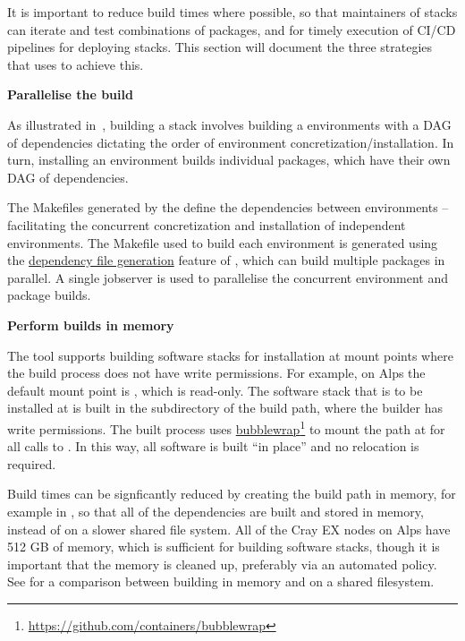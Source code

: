 It is important to reduce build times where possible, so that maintainers of stacks can iterate and test combinations of packages, and for timely execution of CI/CD pipelines for deploying stacks.
This section will document the three strategies that \stackinator uses to achieve this.

\noindent\textbf{Parallelise the build}

As illustrated in~, building a \spack stack involves building a \spack environments with a DAG of dependencies dictating the order of environment concretization/installation.
In turn, installing an environment builds individual packages, which have their own DAG of dependencies.

The Makefiles generated by the \stackinator define the dependencies between environments -- facilitating the concurrent concretization and installation of independent environments. The Makefile used to build each environment is generated using the
\href{https://spack.readthedocs.io/en/latest/environments.html#generating-depfiles-from-environments}{dependency file generation}
feature of \spack, which can build multiple packages in parallel.
A single jobserver is used to parallelise the concurrent environment and package builds.

\noindent\textbf{Perform builds in memory}

The \stackinator tool supports building software stacks for installation at mount points where the build process does not have write permissions.
For example, on Alps the default mount point is , which is read-only.
The software stack that is to be installed at  is built in the  subdirectory of the build path, where the builder has write permissions.
The built process uses
\href{https://github.com/containers/bubblewrap}{bubblewrap}\footnote{\url{https://github.com/containers/bubblewrap}}
to mount the  path at  for all calls to \spack.
In this way, all software is built ``in place'' and no relocation is required.

Build times can be signficantly reduced by creating the build path in memory, for example in , so that all of the dependencies are built and stored in memory, instead of on a slower shared file system.
All of the Cray EX nodes on Alps have 512 GB of memory, which is sufficient for building software stacks, though it is important that the memory is cleaned up, preferably via an automated policy.
See  for a comparison between building in memory and on a shared filesystem.

